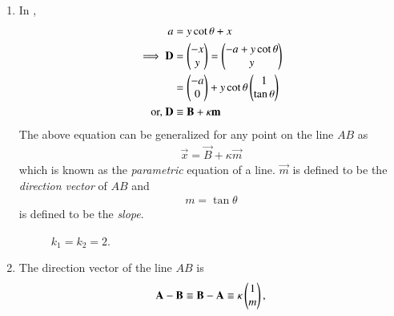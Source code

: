 \begin{enumerate}[label=\thesection.\arabic*.,ref=\thesection.\theenumi]
\item In 
	,
\begin{align}
			\label{eq:line-school}
	a &= y \cot \theta + x
	\\
	\implies \mathbf{D} &= \begin{pmatrix}-x \\ y\end{pmatrix} = \begin{pmatrix}-a + y\cot \theta \\ y\end{pmatrix}
	\\
	&=\begin{pmatrix}-a \\ 0\end{pmatrix}+y\cot \theta \begin{pmatrix} 1 \\ \tan \theta \end{pmatrix}
	\\
	\text{or, }\mathbf{D}&\equiv \mathbf{B} + \kappa \mathbf{m}
\end{align}
The above equation can be generalized for any point on the line $AB$ as
\begin{align}
\vec{x} = \vec{B} + \kappa \vec{m}
\label{eq:geo-param}
\end{align}
		which is known as the {\em parametric} equation of a line.
		$\vec{m}$ is defined to be the {\em direction vector} of $AB$ and
\begin{align}
	m = \tan \theta
\end{align}
		is defined to be the {\em slope}.
\begin{figure}[!ht]
	\begin{center}
		\resizebox{\columnwidth}{!}{}
	\end{center}
	\caption{$k_1=k_2=2$.}
	\label{fig:line-eq}	
\end{figure}
\item The direction vector of the line $AB$ is
\begin{align}
	\mathbf{A}-
	\mathbf{B} \equiv
	\mathbf{B}-
	\mathbf{A} \equiv \kappa \begin{pmatrix}1 \\ m\end{pmatrix},
\label{eq:dir-vec}
\end{align}
			

\end{enumerate}

